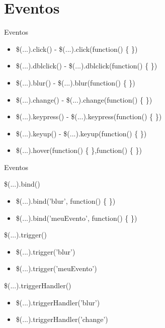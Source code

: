 \section{Eventos}
\begin{frame}{Eventos}
\begin{itemize}
	\pause\item \$(...).click() - \$(...).click(function() \{ \})
	\pause\item \$(...).dblclick() - \$(...).dblclick(function() \{ \})
	\pause\item \$(...).blur() - \$(...).blur(function() \{ \})
	\pause\item \$(...).change() - \$(...).change(function() \{ \})
	\pause\item \$(...).keypress() - \$(...).keypress(function() \{ \})
	\pause\item \$(...).keyup() - \$(...).keyup(function() \{ \})
	\pause\item \$(...).hover(function() \{ \},function() \{ \})
\end{itemize}
\end{frame}
\begin{frame}{Eventos}
\begin{block}{\$(...).bind()}
\begin{itemize}
	\item \$(...).bind('blur', function() \{ \})
	\item \$(...).bind('meuEvento', function() \{ \})
\end{itemize}
\end{block}

\pause \begin{block}{\$(...).trigger()}
\begin{itemize}
	\item \$(...).trigger('blur')
	\item \$(...).trigger('meuEvento')
\end{itemize}
\end{block}

\pause \begin{block}{\$(...).triggerHandler()}
\begin{itemize}
	\item \$(...).triggerHandler('blur')
	\item \$(...).triggerHandler('change')
\end{itemize}
\end{block}
\end{frame}
